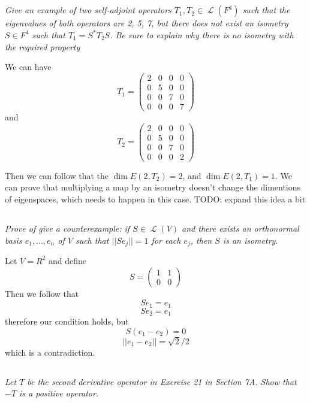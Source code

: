 \documentclass[11pt,oneside,titlepage]{book}
\DeclareMathOperator \map {\mathcal {L}}
\begin{document}
\subsection{}

\textit{Give an example of two self-adjoint operators $T_1, T_2 \in \map(F^4)$ such that
  the eigenvalues of both operators are 2, 5, 7, but there does not exist an isometry
  $S \in F^4$ such that $T_1 = S^* T_2 S$. Be sure to explain why there is no
  isometry with the required property
}

We can have
$$ T_1 = 
\begin{pmatrix}
  2 & 0 & 0 & 0 \\
  0 & 5 & 0 & 0 \\
  0 & 0 & 7 & 0 \\
  0 & 0 & 0 & 7
\end{pmatrix}
$$
and
$$ T_2 = 
\begin{pmatrix}
  2 & 0 & 0 & 0 \\
  0 & 5 & 0 & 0 \\
  0 & 0 & 7 & 0 \\
  0 & 0 & 0 & 2
\end{pmatrix}
$$

Then we can follow that the $\dim E(2, T_2) = 2$, and $\dim E(2, T_1) = 1$. We can prove that
multiplying a map by an isometry doesn't change the dimentions of eigenspaces, which needs to
happen in this case. TODO: expand this idea a bit

\subsection{}

\textit{Prove of give a counterexample: if $S \in \map(V)$ and there exists an orthonormal
  basis $e_1, ..., e_n$ of $V$ such that $||S e_j|| = 1$ for each $e_j$, then $S$ is an
  isometry.}

Let $V = R^2$ and define
$$S =
\begin{pmatrix}
  1 & 1 \\
  0 & 0
\end{pmatrix}
$$
Then we follow that
$$S e_1 = e_1$$
$$S e_2 = e_1$$
therefore our condition holds, but
$$S (e_1 - e_2) = 0$$
$$||e_1 - e_2||= \sqrt{2}/2$$
which is a contradiction.

\subsection{}

\textit{Let $T$ be the second derivative operator in Exercise 21 in Section 7A. Show that $-T$
  is a positive operator.}
\end{document}
